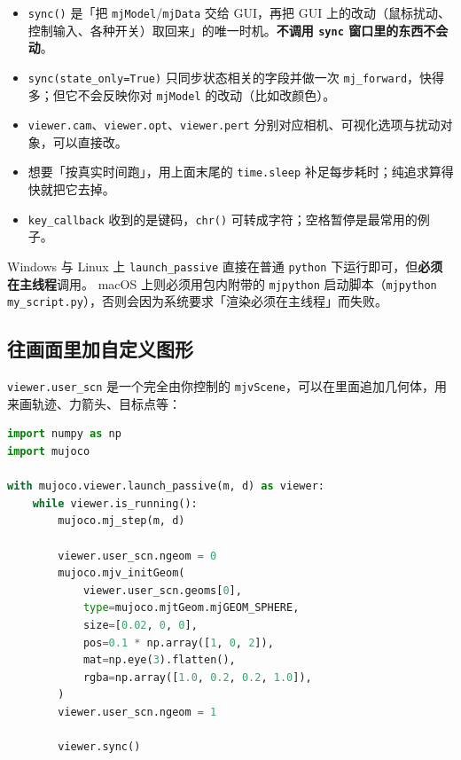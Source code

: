 \begin{itemize}
	\item \texttt{sync()} 是「把 \texttt{mjModel}/\texttt{mjData} 交给 GUI，再把 GUI 上的改动（鼠标扰动、控制输入、各种开关）取回来」的唯一时机。\textbf{不调用 \texttt{sync} 窗口里的东西不会动}。
	\item \texttt{sync(state\_only=True)} 只同步状态相关的字段并做一次 \texttt{mj\_forward}，快得多；但它不会反映你对 \texttt{mjModel} 的改动（比如改颜色）。
	\item \texttt{viewer.cam}、\texttt{viewer.opt}、\texttt{viewer.pert} 分别对应相机、可视化选项与扰动对象，可以直接改。
	\item 想要「按真实时间跑」，用上面末尾的 \texttt{time.sleep} 补足每步耗时；纯追求算得快就把它去掉。
	\item \texttt{key\_callback} 收到的是键码，\texttt{chr()} 可转成字符；空格暂停是最常用的例子。
\end{itemize}

\begin{warnbox}[平台注意]
	Windows 与 Linux 上 \texttt{launch\_passive} 直接在普通 \texttt{python} 下运行即可，但\textbf{必须在主线程}调用。
	macOS 上则必须用包内附带的 \texttt{mjpython} 启动脚本（\texttt{mjpython my\_script.py}），否则会因为系统要求「渲染必须在主线程」而失败。
\end{warnbox}

\subsection{往画面里加自定义图形}

\texttt{viewer.user\_scn} 是一个完全由你控制的 \texttt{mjvScene}，可以在里面追加几何体，用来画轨迹、力箭头、目标点等：

\begin{lstlisting}[style=code, language=Python]
import numpy as np
import mujoco

with mujoco.viewer.launch_passive(m, d) as viewer:
    while viewer.is_running():
        mujoco.mj_step(m, d)

        viewer.user_scn.ngeom = 0
        mujoco.mjv_initGeom(
            viewer.user_scn.geoms[0],
            type=mujoco.mjtGeom.mjGEOM_SPHERE,
            size=[0.02, 0, 0],
            pos=0.1 * np.array([1, 0, 2]),
            mat=np.eye(3).flatten(),
            rgba=np.array([1.0, 0.2, 0.2, 1.0]),
        )
        viewer.user_scn.ngeom = 1

        viewer.sync()
\end{lstlisting}

